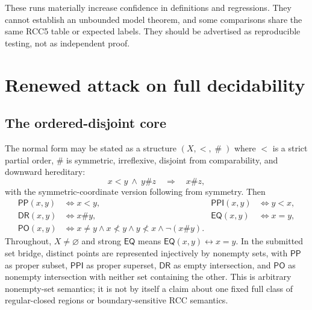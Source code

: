 \documentclass[11pt]{article}
\newcommand{\PO}{\ensuremath{\mathsf{PO}}}
\newcommand{\PP}{\ensuremath{\mathsf{PP}}}
\newcommand{\PPI}{\ensuremath{\mathsf{PPI}}}
\newcommand{\DR}{\ensuremath{\mathsf{DR}}}
\newcommand{\EQ}{\ensuremath{\mathsf{EQ}}}
\begin{document}
These runs materially increase confidence in definitions and regressions.  They
cannot establish an unbounded model theorem, and some comparisons share the
same RCC5 table or expected labels.  They should be advertised as reproducible
testing, not as independent proof.

\section{Renewed attack on full decidability}

\subsection{The ordered-disjoint core}

The normal form may be stated as a structure \((X,<,\mathrel{\#})\) where
\(<\) is a strict partial order, \(\#\) is symmetric, irreflexive, disjoint
from comparability, and downward hereditary:
\[
x<y\ \wedge\ y\# z\quad\Longrightarrow\quad x\# z,
\]
with the symmetric-coordinate version following from symmetry.  Then
\[
\begin{aligned}
\PP(x,y)&\iff x<y, &
\PPI(x,y)&\iff y<x,\\
\DR(x,y)&\iff x\#y, &
\EQ(x,y)&\iff x=y,\\
\PO(x,y)&\iff x\ne y\wedge x\not<y\wedge y\not<x\wedge\neg(x\#y).
\end{aligned}
\]
Throughout, \(X\ne\varnothing\) and strong \EQ{} means
\(\EQ(x,y)\leftrightarrow x=y\).  In the submitted set bridge, distinct points
are represented injectively by nonempty sets, with \PP{} as proper subset,
\PPI{} as proper superset, \DR{} as empty intersection, and \PO{} as nonempty
intersection with neither set containing the other.  This is arbitrary
nonempty-set semantics; it is not by itself a claim about one fixed full class
of regular-closed regions or boundary-sensitive RCC semantics.
\end{document}
